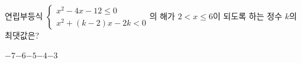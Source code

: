 연립부등식 $\begin{cases} x^2-4x-12\le 0 \\ x^2+(k-2)x-2k<0 \end{cases}$의 해가 $2<x\le 6$이 되도록 하는 정수 $k$의 최댓값은?
\begin{choices32}{$-7$}{$-6$}{$-5$}{$-4$}{$-3$}\end{choices32}
